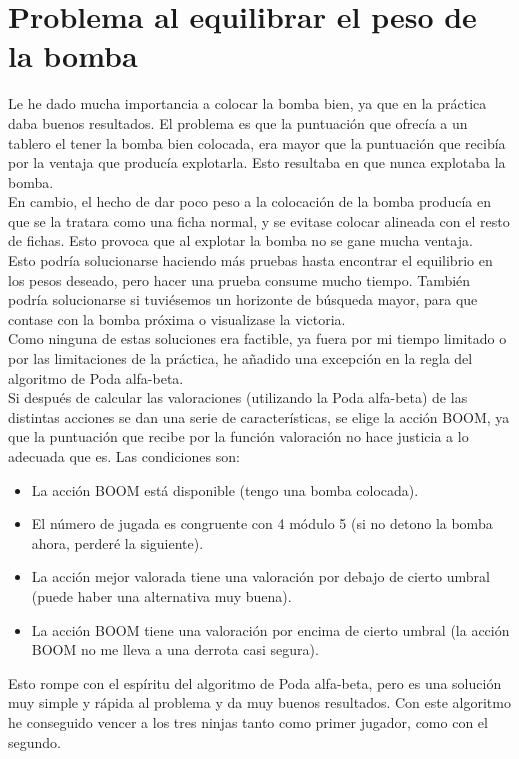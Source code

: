 \documentclass{article}
\begin{document}
\section{Problema al equilibrar el peso de la bomba}

Le he dado mucha importancia a colocar la bomba bien, ya que en la
práctica daba buenos resultados. El problema es que la puntuación que
ofrecía a un tablero el tener la bomba bien colocada, era mayor que la
puntuación que recibía por la ventaja que producía explotarla. Esto
resultaba en que nunca explotaba la bomba. \\

En cambio, el hecho de dar poco peso a la colocación de la bomba
producía en que se la tratara como una ficha normal, y se evitase
colocar alineada con el resto de fichas. Esto provoca que al explotar
la bomba no se gane mucha ventaja. \\

Esto podría solucionarse haciendo más pruebas hasta encontrar el
equilibrio en los pesos deseado, pero hacer una prueba consume mucho
tiempo. También podría solucionarse si tuviésemos un horizonte de
búsqueda mayor, para que contase con la bomba próxima o visualizase la victoria. \\

Como ninguna de estas soluciones era factible, ya fuera por mi tiempo
limitado o por las limitaciones de la práctica, he añadido una
excepción en la regla del algoritmo de Poda alfa-beta. \\

Si después de calcular las valoraciones (utilizando la Poda alfa-beta)
de las distintas acciones se dan una serie de características, se
elige la acción BOOM, ya que la puntuación que recibe por la función
valoración no hace justicia a lo adecuada que es. Las condiciones son:
\begin{itemize}
\item La acción BOOM está disponible (tengo una bomba colocada).
\item El número de jugada es congruente con 4 módulo 5 (si no detono
  la bomba ahora, perderé la siguiente).
\item La acción mejor valorada tiene una valoración por debajo de
  cierto umbral (puede haber una alternativa muy buena).
\item La acción BOOM tiene una valoración por encima de cierto umbral
  (la acción BOOM no me lleva a una derrota casi segura).
\end{itemize}

Esto rompe con el espíritu del algoritmo de Poda alfa-beta, pero es
una solución muy simple y rápida al problema y da muy buenos
resultados. Con este algoritmo he conseguido vencer a los tres ninjas
tanto como primer jugador, como con el segundo.
\end{document}
